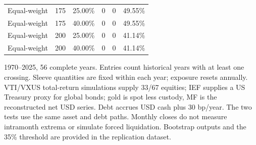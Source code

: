 \begin{table}[p]
{\begin{tabular}{lrrrrr}
Equal-weight & 175 & 25.00\% & 0 & 0 & 49.55\% \\
Equal-weight & 175 & 40.00\% & 0 & 0 & 49.55\% \\
Equal-weight & 200 & 25.00\% & 0 & 0 & 41.14\% \\
Equal-weight & 200 & 40.00\% & 0 & 0 & 41.14\% \\
\bottomrule\end{tabular}}
\par\smallskip\begin{minipage}{0.97\textwidth}\footnotesize 1970--2025, 56 complete years. Entries count historical years with at least one crossing. Sleeve quantities are fixed within each year; exposure resets annually. VTI/VXUS total-return simulations supply 33/67 equities; IEF supplies a US Treasury proxy for global bonds; gold is spot less custody, MF is the reconstructed net USD series. Debt accrues USD cash plus 30 bp/year. The two tests use the same asset and debt paths. Monthly closes do not measure intramonth extrema or simulate forced liquidation. Bootstrap outputs and the 35\% threshold are provided in the replication dataset.\end{minipage}\end{table}
